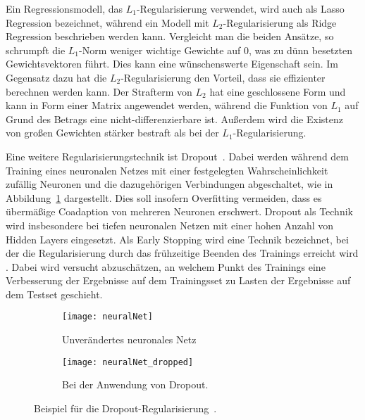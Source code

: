 Ein Regressionsmodell, das \(L_1\)-Regularisierung verwendet, wird auch als Lasso Regression bezeichnet, 
während ein Modell mit \(L_2\)-Regularisierung als Ridge Regression beschrieben werden kann.
Vergleicht man die beiden Ansätze, so schrumpft die \(L_1\)-Norm weniger wichtige Gewichte auf 0, was zu dünn besetzten Gewichtsvektoren führt.
Dies kann eine wünschenswerte Eigenschaft sein.
Im Gegensatz dazu hat die \(L_2\)-Regularisierung den Vorteil, dass sie effizienter berechnen werden kann.
Der Strafterm von \(L_2\) hat eine geschlossene Form und kann in Form einer Matrix angewendet werden, während die Funktion von \(L_1\) auf Grund des Betrags eine nicht-differenzierbare ist.
Außerdem wird die Existenz von großen Gewichten stärker bestraft als bei der \(L_1\)-Regularisierung.


Eine weitere Regularisierungstechnik ist Dropout~\cite{JMLR:v15:srivastava14a}.
Dabei werden während dem Training eines neuronalen Netzes 
mit einer festgelegten Wahrscheinlichkeit zufällig Neuronen und die dazugehörigen Verbindungen abgeschaltet, 
wie in Abbildung~\ref{fig:dropout} dargestellt.
Dies soll insofern Overfitting vermeiden, dass es übermäßige Coadaption von mehreren Neuronen erschwert.
Dropout als Technik wird insbesondere bei tiefen neuronalen Netzen mit einer hohen Anzahl von Hidden Layers eingesetzt. 
Als Early Stopping wird eine Technik bezeichnet, bei der die Regularisierung durch das frühzeitige Beenden des Trainings erreicht wird \cite[Kapitel 7.8]{Goodfellow-et-al-2016}.
Dabei wird versucht abzuschätzen, an welchem Punkt des Trainings 
eine Verbesserung der Ergebnisse auf dem Trainingsset zu Lasten der Ergebnisse auf dem Testset geschieht.


\begin{figure}[h]
    \centering
    \begin{subfigure}[t]{0.4\textwidth}
		\texttt{[image: neuralNet]}
		\caption{Unverändertes neuronales Netz}
    \end{subfigure}
    \begin{subfigure}[t]{0.4\textwidth}
		\texttt{[image: neuralNet\_dropped]}
		\caption{Bei der Anwendung von Dropout.}
	\end{subfigure}
    \caption{Beispiel für die Dropout-Regularisierung~\cite{JMLR:v15:srivastava14a}.}
    \label{fig:dropout}
\end{figure}





